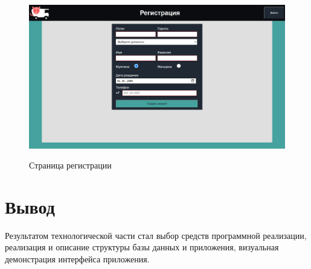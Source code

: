 \begin{figure}[h!] 
	\begin{center}
		{\includegraphics[scale=0.38, angle=0]{sc/signup}}
		\caption{Страница регистрации}
		\label{signup_sc}
	\end{center}
\end{figure}


\section*{Вывод}
Результатом технологической части стал выбор средств программной реализации, реализация и описание структуры базы данных и приложения, визуальная демонстрация интерфейса приложения.
